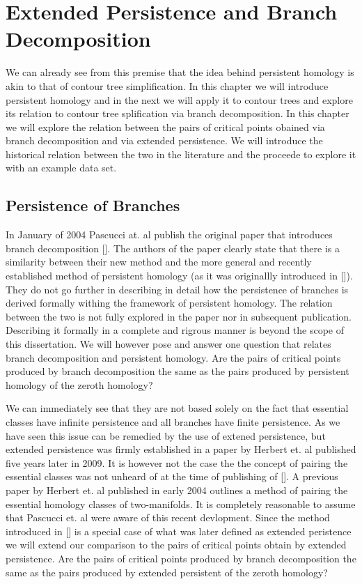 \chapter{Extended Persistence and Branch Decomposition}
\label{chapter6}

We can already see from this premise that the idea behind persistent homology is akin to that of contour tree simplification. In this chapter we will introduce persistent homology and in the next we will apply it to contour trees and explore its relation to contour tree splification via branch decomposition. In this chapter we will explore the relation between the pairs of critical points obained via branch decomposition and via extended persistence. We will introduce the historical relation between the two in the literature and the proceede to explore it with an example data set.

\section{Persistence of Branches}

In January of 2004 Pascucci at. al publish the original paper that introduces branch decomposition []. The authors of the paper clearly state that there is a similarity between their new method and the more general and recently established method of persistent homology (as it was originallly introduced in []). They do not go further in describing in detail how the persistence of branches is derived formally withing the framework of persistent homology. The relation between the two is not fully explored in the paper nor in subsequent publication. Describing it formally in a complete and rigrous manner is beyond the scope of this dissertation. We will however pose and answer one question that relates branch decomposition and persistent homology. Are the pairs of critical points produced by branch decomposition the same as the pairs produced by persistent homology of the zeroth homology?

We can immediately see that they are not based solely on the fact that essential classes have infinite persistence and all branches have finite persistence. As we have seen this issue can be remedied by the use of extened persistence, but extended persistence was firmly established in a paper by Herbert et. al published five years later in 2009. It is however not the case the the concept of pairing the essential classes was not unheard of at the time of publishing of []. A previous paper \cite{extreme-elevation} by Herbert et. al published in early 2004 outlines a method of pairing the essential homology classes of two-manifolds. It is completely reasonable to assume that Pascucci et. al were aware of this recent devlopment. Since the method introduced in [] is a special case of what was later defined as extended peristence we will extend our comparison to the pairs of critical points obtain by extended persistence. Are the pairs of critical points produced by branch decomposition the same as the pairs produced by extended persistent of the zeroth homology?

